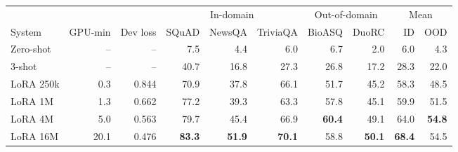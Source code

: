 \begin{tabular}{lrrrrrrrrr}
\toprule
 & & & \multicolumn{3}{c}{In-domain} & \multicolumn{2}{c}{Out-of-domain} & \multicolumn{2}{c}{Mean} \\
\cmidrule(lr){4-6}\cmidrule(lr){7-8}\cmidrule(lr){9-10}
System & GPU-min & Dev loss & SQuAD & NewsQA & TriviaQA & BioASQ & DuoRC & ID & OOD \\
\midrule
Zero-shot & -- & -- & 7.5 & 4.4 & 6.0 & 6.7 & 2.0 & 6.0 & 4.3 \\
3-shot & -- & -- & 40.7 & 16.8 & 27.3 & 26.8 & 17.2 & 28.3 & 22.0 \\
\midrule
LoRA 250k & 0.3 & 0.844 & 70.9 & 37.8 & 66.1 & 51.7 & 45.2 & 58.3 & 48.5 \\
LoRA 1M & 1.3 & 0.662 & 77.2 & 39.3 & 63.3 & 57.8 & 45.1 & 59.9 & 51.5 \\
LoRA 4M & 5.0 & 0.563 & 79.7 & 45.4 & 66.9 & \textbf{60.4} & 49.1 & 64.0 & \textbf{54.8} \\
LoRA 16M & 20.1 & 0.476 & \textbf{83.3} & \textbf{51.9} & \textbf{70.1} & 58.8 & \textbf{50.1} & \textbf{68.4} & 54.5 \\
\bottomrule
\end{tabular}